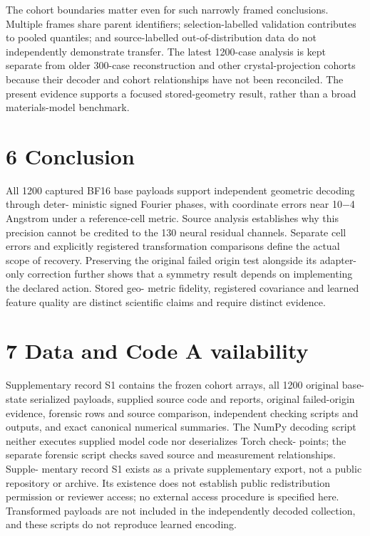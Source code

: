 \documentclass[11pt]{article}
\begin{document}
The cohort boundaries matter even for such narrowly framed conclusions. Multiple frames share
parent identifiers; selection-labelled validation contributes to pooled quantiles; and source-labelled
out-of-distribution data do not independently demonstrate transfer. The latest 1200-case analysis
is kept separate from older 300-case reconstruction and other crystal-projection cohorts because
their decoder and cohort relationships have not been reconciled. The present evidence supports a
focused stored-geometry result, rather than a broad materials-model benchmark.

\section*{6 Conclusion}

All 1200 captured BF16 base payloads support independent geometric decoding through deter-
ministic signed Fourier phases, with coordinate errors near 10\ensuremath{-}4 Angstrom under a reference-cell
metric. Source analysis establishes why this precision cannot be credited to the 130 neural residual
channels. Separate cell errors and explicitly registered transformation comparisons define the actual
scope of recovery. Preserving the original failed origin test alongside its adapter-only correction
further shows that a symmetry result depends on implementing the declared action. Stored geo-
metric fidelity, registered covariance and learned feature quality are distinct scientific claims and
require distinct evidence.

\section*{7 Data and Code A vailability}

Supplementary record S1 contains the frozen cohort arrays, all 1200 original base-state serialized
payloads, supplied source code and reports, original failed-origin evidence, forensic rows and source
comparison, independent checking scripts and outputs, and exact canonical numerical summaries.
The NumPy decoding script neither executes supplied model code nor deserializes Torch check-
points; the separate forensic script checks saved source and measurement relationships. Supple-
mentary record S1 exists as a private supplementary export, not a public repository or archive. Its
existence does not establish public redistribution permission or reviewer access; no external access
procedure is specified here. Transformed payloads are not included in the independently decoded
collection, and these scripts do not reproduce learned encoding.
\end{document}
